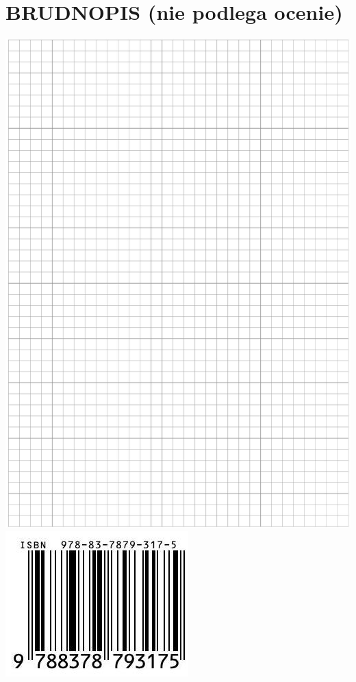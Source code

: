 \documentclass[10pt]{article}
\begin{document}
\section*{BRUDNOPIS (nie podlega ocenie)}
\includegraphics[max width=\textwidth, center]{2024_11_21_99eb8e6624b497a5af43g-19}\\
\includegraphics[max width=\textwidth, center]{2024_11_21_99eb8e6624b497a5af43g-20}
\end{document}
